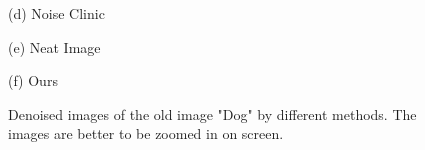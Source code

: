 \documentclass[runningheads]{llncs}
\begin{document}
\begin{figure}
{\begin{minipage}[t]{0.33\textwidth}
{\footnotesize (d) Noise Clinic}
\end{minipage}
\begin{minipage}[t]{0.33\textwidth}
\centering
{}
{\footnotesize (e) Neat Image}
\end{minipage}
\begin{minipage}[t]{0.33\textwidth}
\centering
{}
{\footnotesize (f) Ours }
\end{minipage}
}
\caption{Denoised images of the old image "Dog" by different methods. The images are better to be zoomed in on screen.}
\label{fig18}
\end{figure}
\end{document}
